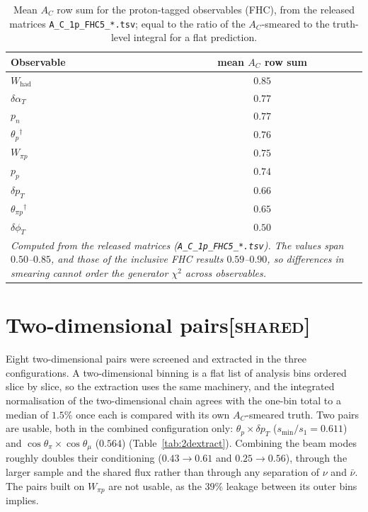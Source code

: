\documentclass[11pt,a4paper]{article}
\newcommand{\scopetag}[1]{\hfill{\normalfont\small\textsc{[#1]}}}
\begin{document}
\begin{table}[H]
  \centering
  \caption{Mean $A_C$ row sum for the proton-tagged observables (FHC), from the released
    matrices \texttt{A\_C\_1p\_FHC5\_*.tsv}; equal to the ratio of the
    $A_C$-smeared to the truth-level integral for a flat prediction.}
  \label{tab:acwtki}
  \par\smallskip{}
  \begin{tabular}{lc}
      \toprule
      Observable & mean $A_C$ row sum \\
      \midrule
      $W_\mathrm{had}$   & $0.85$ \\
      $\delta\alpha_T$   & $0.77$ \\
      $p_n$              & $0.77$ \\
      $\theta_p$$^{\dagger}$         & $0.76$ \\
      $W_{\pi p}$        & $0.75$ \\
      $p_p$              & $0.74$ \\
      $\delta p_T$       & $0.66$ \\
      $\theta_{\pi p}$$^{\dagger}$      & $0.65$ \\
      $\delta\phi_T$     & $0.50$ \\
      \midrule
      \multicolumn{2}{p{0.72\textwidth}}{\emph{Computed from the released matrices
        (\texttt{A\_C\_1p\_FHC5\_*.tsv}). The values span $0.50$--$0.85$, and those of the
        inclusive FHC results $0.59$--$0.90$, so differences in smearing cannot order the
        generator $\chi^2$ across observables.}} \\
      \bottomrule
    \end{tabular}
\end{table}


\section[Two-dimensional pairs]{Two-dimensional pairs\scopetag{shared}}
\label{sec:supp_2d}

Eight two-dimensional pairs were screened and extracted in the three configurations. A
two-dimensional binning is a flat list of analysis bins ordered slice by slice, so the extraction
uses the same machinery, and the integrated normalisation of the two-dimensional chain agrees with
the one-bin total to a median of $1.5\%$ once each is compared with its own $A_C$-smeared truth.
Two pairs are usable, both in the combined configuration only: $\theta_p\times\delta p_T$
($s_{\min}/s_1=0.611$) and $\cos\theta_\pi\times\cos\theta_\mu$ ($0.564$) (Table~\ref{tab:2dextract}).
Combining the beam modes roughly doubles their conditioning ($0.43\to0.61$ and $0.25\to0.56$), through
the larger sample and the shared flux rather than through any separation of $\nu$ and $\bar\nu$. The
pairs built on $W_{\pi p}$ are not usable, as the $39\%$ leakage between its outer bins implies.
\end{document}
